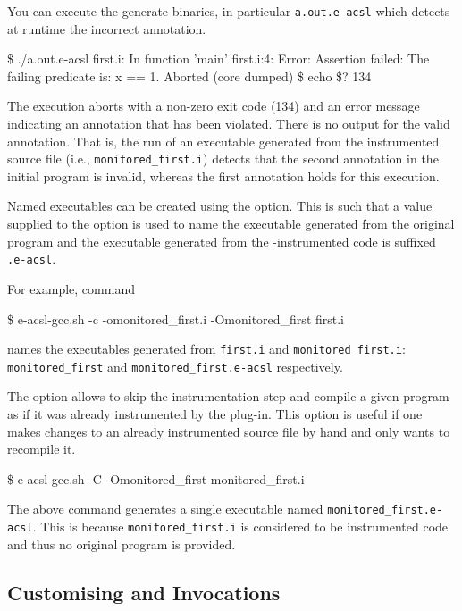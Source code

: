 You can execute the generate binaries, in particular \texttt{a.out.e-acsl} which
detects at runtime the incorrect annotation.
\begin{logs}
\$ ./a.out.e-acsl
first.i: In function 'main'
first.i:4: Error: Assertion failed:
        The failing predicate is:
        x == 1.
Aborted (core dumped)
\$ echo \$?
134
\end{logs}
The execution aborts with a non-zero exit code (134) and an error message
indicating an \eacsl annotation that has been violated. There is no output for
the valid \eacsl annotation. That is, the run of an executable generated from
the instrumented source file (i.e., \texttt{monitored\_first.i}) detects that
the second annotation in the initial program is invalid, whereas the first
annotation holds for this execution.

Named executables can be created using the  option.  This is such
that a value supplied to the  option is used to name the executable
generated from the original program and the executable generated from the
\eacsl-instrumented code is suffixed \texttt{.e-acsl}.

For example, command
\begin{frama-c-commands}
\$ e-acsl-gcc.sh -c -omonitored_first.i -Omonitored_first first.i
\end{frama-c-commands}
names the executables generated from \texttt{first.i} and
\texttt{monitored\_first.i}: \texttt{monitored\_first} and
\texttt{monitored\_first.e-acsl} respectively.

The \eacslgcc {} option allows to skip the instrumentation step and
compile a given program as if it was already instrumented by the \eacsl
plug-in.  This option is useful if one makes changes to an already
instrumented source file by hand and only wants to recompile it.

\begin{frama-c-commands}
\$ e-acsl-gcc.sh -C -Omonitored_first monitored_first.i
\end{frama-c-commands}

The above command generates a single executable named
\texttt{monitored\_first.e-acsl}. This is because \texttt{monitored\_first.i} is
considered to be instrumented code and thus no original program is provided.

\subsection{Customising \framac and \gcc Invocations}

